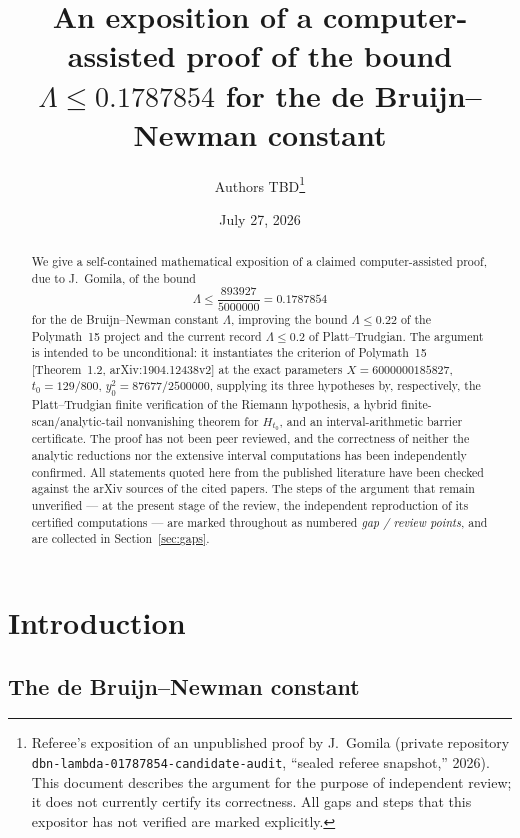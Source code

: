 \documentclass[11pt]{article}
\title{An exposition of a computer-assisted proof of the bound
$\Lambda\le 0.1787854$ for the de Bruijn--Newman constant}
\author{Authors TBD\thanks{Referee's exposition of an unpublished
proof by J.~Gomila (private repository
\texttt{dbn-lambda-01787854-candidate-audit}, ``sealed referee snapshot,''
2026). This document describes the argument for the purpose of
independent review; it does not currently certify its correctness. All gaps and
steps that this expositor has not verified are marked explicitly.}}
\date{July 27, 2026}
\theoremstyle{definition}
\newcommand{\LB}{\Lambda}
\begin{document}
\maketitle

\begin{abstract}
We give a self-contained mathematical exposition of a claimed computer-assisted proof, due to J.~Gomila, of the bound
\[
\LB\le\frac{893927}{5000000}=0.1787854
\]
for the de Bruijn--Newman constant $\LB$, improving the bound
$\LB\le0.22$ of the Polymath~15 project and the current record
$\LB\le0.2$ of Platt--Trudgian. The argument is intended to be
unconditional: it instantiates the criterion of Polymath~15
[Theorem~1.2, arXiv:1904.12438v2] at the exact parameters
$X=6000000185827$, $t_0=129/800$, $y_0^2=87677/2500000$, supplying its
three hypotheses by, respectively, the Platt--Trudgian finite
verification of the Riemann hypothesis, a hybrid finite-scan/analytic-tail
nonvanishing theorem for $H_{t_0}$, and an interval-arithmetic barrier
certificate. The proof has not been peer reviewed, and the
correctness of neither the analytic reductions nor the extensive interval
computations has been independently confirmed. All statements quoted
here from the published literature have been checked against the arXiv
sources of the cited papers. The steps of the argument that
remain unverified --- at the present stage of the review, the
independent reproduction of its certified computations --- are
marked throughout as numbered \emph{gap / review points}, and are
collected in Section~\ref{sec:gaps}.
\end{abstract}

\tableofcontents

\section{Introduction}

\subsection{The de Bruijn--Newman constant}
\end{document}
